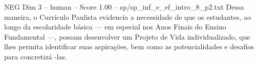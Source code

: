 \begin{textsample}{NEG Dim 3 – human – Score 1.00 – sp/sp\_inf\_e\_ef\_intro\_8\_p2.txt}  \label{ex:f3_neg_010}
Dessa maneira, o Currículo Paulista evidencia a necessidade de que os estudantes, ao longo da escolaridade básica — em especial nos Anos Finais do Ensino Fundamental —, possam desenvolver um Projeto de Vida individualizado, que lhes permita identificar suas aspirações, bem como as potencialidades e desafios para concretizá -las.

\end{textsample}
